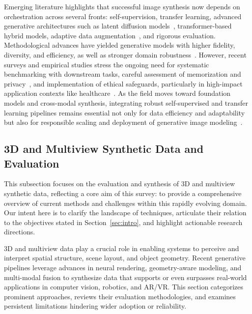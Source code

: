 \documentclass[sigconf]{acmart}
\begin{document}
Emerging literature highlights that successful image synthesis now depends on orchestration across several fronts: self-supervision, transfer learning, advanced generative architectures such as latent diffusion models~\cite{ref100,ref102}, transformer-based hybrid models, adaptive data augmentation~\cite{ref54,ref55,ref61,ref64,ref66}, and rigorous evaluation. Methodological advances have yielded generative models with higher fidelity, diversity, and efficiency, as well as stronger domain robustness~\cite{ref79,ref100,ref101,ref102}. However, recent surveys and empirical studies stress the ongoing need for systematic benchmarking with downstream tasks, careful assessment of memorization and privacy~\cite{ref21,ref91}, and implementation of ethical safeguards, particularly in high-impact application contexts like healthcare~\cite{ref89,ref91}. As the field moves toward foundation models and cross-modal synthesis, integrating robust self-supervised and transfer learning pipelines remains essential not only for data efficiency and adaptability but also for responsible scaling and deployment of generative image modeling~\cite{ref1,ref2,ref3,ref5,ref6,ref10,ref12,ref13,ref14,ref15,ref16,ref18,ref21,ref22,ref23,ref24,ref25,ref26,ref29,ref30,ref32,ref54,ref55,ref60,ref61,ref62,ref64,ref65,ref66,ref70,ref73,ref74,ref76,ref79,ref81,ref83,ref85,ref89,ref90,ref91,ref92,ref93,ref94,ref95,ref96,ref97,ref100,ref101,ref102}.

\subsection{3D and Multiview Synthetic Data and Evaluation}
This subsection focuses on the evaluation and synthesis of 3D and multiview synthetic data, reflecting a core aim of this survey: to provide a comprehensive overview of current methods and challenges within this rapidly evolving domain. Our intent here is to clarify the landscape of techniques, articulate their relation to the objectives stated in Section~\ref{sec:intro}, and highlight actionable research directions.

3D and multiview data play a crucial role in enabling systems to perceive and interpret spatial structure, scene layout, and object geometry. Recent generative pipelines leverage advances in neural rendering, geometry-aware modeling, and multi-modal fusion to synthesize data that supports or even surpasses real-world applications in computer vision, robotics, and AR/VR. This section categorizes prominent approaches, reviews their evaluation methodologies, and examines persistent limitations hindering wider adoption or reliability.
\end{document}
